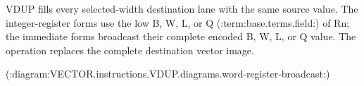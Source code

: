 VDUP fills every selected-width destination lane with the same source value.
The integer-register forms use the low B, W, L, or Q (:term:base.terms.field:) of
Rn; the immediate forms broadcast their complete encoded B, W, L, or Q value.
The operation replaces the complete destination vector image.

(:diagram:VECTOR.instructions.VDUP.diagrams.word-register-broadcast:)
